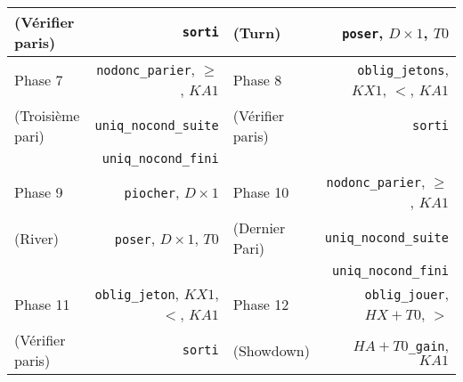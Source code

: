 \documentclass{beamercours}
\begin{document}
\begin{frame}
{\begin{table}
{\begin{tabular}{lr|lr}
                (Vérifier paris) & \texttt{sorti} & (Turn) & \texttt{poser}, $D\times 1$, $T0$\\
                \midrule
                Phase 7 & \texttt{nodonc\_parier}, $\geq$, $KA1$ & Phase 8 & \texttt{oblig\_jetons}, $KX1$, $<$, $KA1$\\
                (Troisième pari) & \texttt{uniq\_nocond\_suite} & (Vérifier paris) & \texttt{sorti}\\
                & \texttt{uniq\_nocond\_fini}\\
                \midrule
                Phase 9 & \texttt{piocher}, $D \times 1$ & Phase 10 & \texttt{nodonc\_parier}, $\geq$, $KA1$\\
                (River) & \texttt{poser}, $D\times 1$, $T0$ & (Dernier Pari) & \texttt{uniq\_nocond\_suite}\\
                & & & \texttt{uniq\_nocond\_fini}\\
                \midrule
                Phase 11 & \texttt{oblig\_jeton}, $KX1$, $<$, $KA1$ & Phase 12 & \texttt{oblig\_jouer}, $HX + T0$, $>$\\
                (Vérifier paris) & \texttt{sorti} & (Showdown) & $HA + T0$\texttt{\_gain}, $KA1$\\
                \bottomrule
            \end{tabular}}
        \end{table}
    }

\end{frame}
\end{document}
